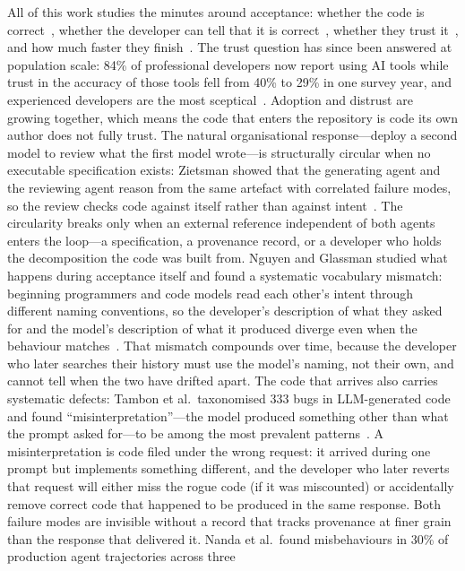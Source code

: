 All of this work studies the minutes around acceptance: whether the code is
correct~\cite{perry2023}, whether the developer can tell that it is
correct~\cite{vasconcelos2025}, whether they trust
it~\cite{liang2024,cheng2024}, and how much faster they
finish~\cite{mozannar2024,cui2025}. The trust question has since been answered at
population scale: 84\% of professional developers now report using AI tools while
trust in the accuracy of those tools fell from 40\% to 29\% in one survey year,
and experienced developers are the most sceptical~\cite{stackoverflow2025}.
Adoption and distrust are growing together, which means the code that enters the
repository is code its own author does not fully trust. The natural organisational
response---deploy a second model to review what the first model
wrote---is structurally circular when no executable specification exists:
Zietsman showed that the generating agent and the reviewing agent reason from the
same artefact with correlated failure modes, so the review checks code against
itself rather than against intent~\cite{zietsman2026}. The circularity breaks
only when an external reference independent of both agents enters the
loop---a specification, a provenance record, or a developer who holds the
decomposition the code was built from. Nguyen and Glassman studied what happens
during acceptance itself and found a systematic vocabulary mismatch: beginning
programmers and code models read each other's intent through different naming
conventions, so the developer's description of what they asked for and the
model's description of what it produced diverge even when the behaviour
matches~\cite{nguyen2024}. That mismatch compounds over time, because the
developer who later searches their history must use the model's naming, not
their own, and cannot tell when the two have drifted apart. The code that
arrives also carries systematic defects: Tambon et al.\ taxonomised 333 bugs in
LLM-generated code and found ``misinterpretation''---the model produced something
other than what the prompt asked for---to be among the most prevalent
patterns~\cite{tambon2024}. A misinterpretation is code filed under the wrong
request: it arrived during one prompt but implements something different, and the
developer who later reverts that request will either miss the rogue code (if it
was miscounted) or accidentally remove correct code that happened to be produced
in the same response. Both failure modes are invisible without a record that
tracks provenance at finer grain than the response that delivered it. Nanda et
al.\ found misbehaviours in 30\% of production agent trajectories across three
